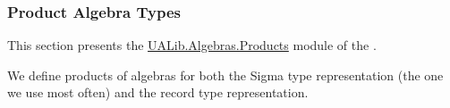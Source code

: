 \subsubsection{Product Algebra Types}\label{product-algebra-types}
This section presents the \href{}{UALib.Algebras.Products} module of the \agdaualib.

We define products of algebras for both the Sigma type representation (the one we use most often) and the record type representation.
\ccpad
\begin{code}%
\>[0]\AgdaSymbol{\{-\#}\AgdaSpace{}%
\AgdaSpace{}%
\AgdaSpace{}%
\AgdaSpace{}%
\AgdaSpace{}%
\AgdaSymbol{\#-\}}\<%
\\
%
\\[\AgdaEmptyExtraSkip]%
\>[0]\AgdaSpace{}%
\AgdaSpace{}%
\<%
\\
%
\\[\AgdaEmptyExtraSkip]%
%
\\[\AgdaEmptyExtraSkip]%
\>[0]\AgdaSpace{}%
\AgdaSpace{}%
\AgdaSpace{}%
\<%
\\
%
\\[\AgdaEmptyExtraSkip]%
%
\\[\AgdaEmptyExtraSkip]%
\>[0]\AgdaSpace{}%
\AgdaModule{\AgdaUnderscore{}}\AgdaSpace{}%
\AgdaSymbol{\{}\AgdaSpace{}%
\AgdaSymbol{:}\AgdaSpace{}%
\AgdaSymbol{\}\{}\AgdaSpace{}%
\AgdaSymbol{:}\AgdaSpace{}%
\AgdaSpace{}%
\AgdaSpace{}%
\AgdaSymbol{\}}%
\>[44]\<%
\\
%
\\[\AgdaEmptyExtraSkip]%
\>[0][@{}l@{\AgdaIndent{0}}]%
\>[1]\<%
\\
%
\>[1]\AgdaSpace{}%
\AgdaSymbol{:}\AgdaSpace{}%
\AgdaSymbol{\{}\AgdaSpace{}%
\AgdaSymbol{:}\AgdaSpace{}%
\AgdaSymbol{\}\{}\AgdaSpace{}%
\AgdaSymbol{:}\AgdaSpace{}%
\AgdaSpace{}%
\AgdaSpace{}%
\AgdaSymbol{\}(}\AgdaSpace{}%
\AgdaSymbol{:}\AgdaSpace{}%
\AgdaSpace{}%
\AgdaSpace{}%
\AgdaSpace{}%
\AgdaSpace{}%
\AgdaSpace{}%

\end{code}
